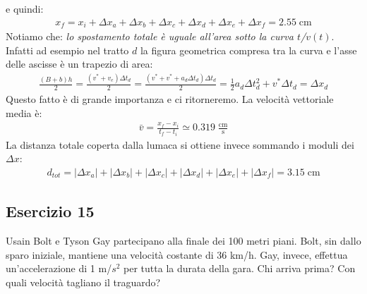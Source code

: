 \documentclass[12pt,a4paper]{book}
\begin{document}
e quindi: 
\begin{gather*}
x_f=x_i+\Delta x_a+\Delta x_b+\Delta x_c+\Delta x_d+ \Delta x_e+\Delta x_f=2.55\; \text{cm} 
\end{gather*}
Notiamo che: \textit{lo spostamento totale è uguale all'area sotto la curva $t$/$v(t)$}. Infatti ad esempio nel tratto $d$ la figura geometrica compresa tra la curva e l'asse delle ascisse è un trapezio di area: 
\begin{gather*}
\frac{(B+b)h}{2}=\frac{(v^*+v_e)\Delta t_d}{2}=\frac{(v^*+v^*+a_d \Delta t_d)\Delta t_d}{2}= \frac{1}{2} a_d \Delta t_d^2  + v^* \Delta t_d =\Delta x_d
\end{gather*}
Questo fatto è di grande importanza e ci ritorneremo. 
La velocità vettoriale media è:
\begin{gather*}
\bar{v}=\frac{x_f-x_i}{t_f-t_i}\simeq 0.319  \;\frac{\text{cm}}{\text{s}}
\end{gather*}
La distanza totale coperta dalla lumaca si ottiene invece sommando i moduli dei $\Delta x$:
\begin{gather*}
d_{tot}=|\Delta x_a|+|\Delta x_b|+|\Delta x_c|+|\Delta x_d|+ |\Delta x_e|+|\Delta x_f|=3.15\;\text{cm} 
\end{gather*}


\subsection*{Esercizio 15}
Usain Bolt e Tyson Gay partecipano alla finale dei 100 metri piani. Bolt, sin dallo sparo iniziale, mantiene una velocità costante di 36 km/h. Gay, invece, effettua un'accelerazione di 1 m/$s^2$ per tutta la durata della gara. Chi arriva prima? Con quali velocità tagliano il traguardo?
\end{document}
